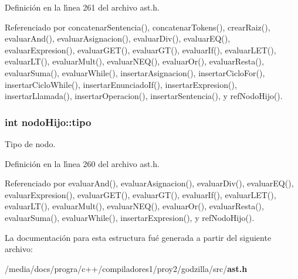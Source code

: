 Definici\'{o}n en la l\'{\i}nea 261 del archivo ast.h.

Referenciado por concatenar\-Sentencia(), concatenar\-Tokens(), crear\-Raiz(), evaluar\-And(), evaluar\-Asignacion(), evaluar\-Div(), evaluar\-EQ(), evaluar\-Expresion(), evaluar\-GET(), evaluar\-GT(), evaluar\-If(), evaluar\-LET(), evaluar\-LT(), evaluar\-Mult(), evaluar\-NEQ(), evaluar\-Or(), evaluar\-Resta(), evaluar\-Suma(), evaluar\-While(), insertar\-Asignacion(), insertar\-Ciclo\-For(), insertar\-Ciclo\-While(), insertar\-Enunciado\-If(), insertar\-Expresion(), insertar\-Llamada(), insertar\-Operacion(), insertar\-Sentencia(), y ref\-Nodo\-Hijo().
\subsubsection{\setlength{\rightskip}{0pt plus 5cm}int {\bf nodo\-Hijo::tipo}}\label{structnodoHijo_o0}


Tipo de nodo. 



Definici\'{o}n en la l\'{\i}nea 260 del archivo ast.h.

Referenciado por evaluar\-And(), evaluar\-Asignacion(), evaluar\-Div(), evaluar\-EQ(), evaluar\-Expresion(), evaluar\-GET(), evaluar\-GT(), evaluar\-If(), evaluar\-LET(), evaluar\-LT(), evaluar\-Mult(), evaluar\-NEQ(), evaluar\-Or(), evaluar\-Resta(), evaluar\-Suma(), evaluar\-While(), insertar\-Expresion(), y ref\-Nodo\-Hijo().

La documentaci\'{o}n para esta estructura fu\'{e} generada a partir del siguiente archivo:\begin{CompactItemize}
\item 
/media/docs/progra/c++/compiladores1/proy2/godzilla/src/{\bf ast.h}\end{CompactItemize}
